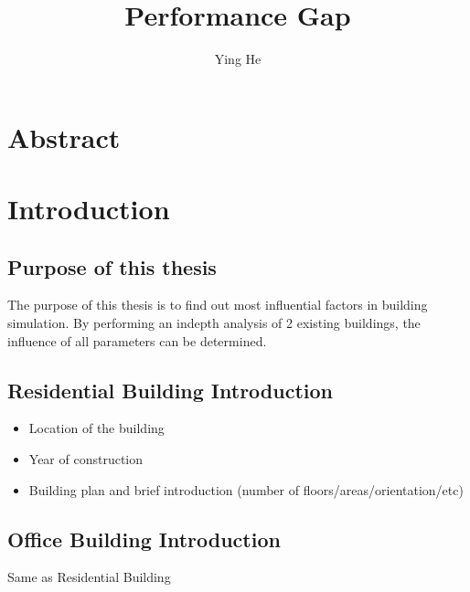 \documentclass[11pt, a4paper]{article}
\title{Performance Gap}
\author{Ying He}
\theoremstyle{definition}
\newcommand{\matx}[4]{\begin{pmatrix} #1 & #2 \\ #3 & #4 \end{pmatrix}}
\newcommand{\hlor}{\colorbox{Apricot}} %
\begin{document}
\begin{comment}
	\begin{landscape}
	\begin{multicols*}{3}
\end{comment}

\begin{comment}
\textbf{abcdefg}





\hlor{abcd}

\[\matx{1}{2}{3}{4}\] al;dfjajfa

woyaozaizhedazi $\matx{1}{2}{3}{4}$



\[\alpha \cdot \beta \]



123456789/*
\end{comment}
\maketitle
\tableofcontents

\section{Abstract}

\section{Introduction}
	\subsection{Purpose of this thesis}
		The purpose of this thesis is to find out most influential factors in building simulation. By performing an indepth analysis of 2 existing buildings, the influence of all parameters can be determined.
	\subsection{Residential Building Introduction}
		\begin{itemize}
			\item Location of the building
			\item Year of construction
			\item Building plan and brief introduction (number of floors/areas/orientation/etc)
		\end{itemize}
		
	\subsection{Office Building Introduction}
		Same as Residential Building
\end{document}

